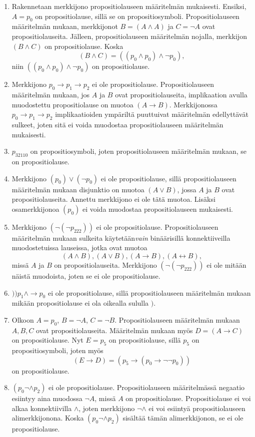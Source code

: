 \documentclass[11pt,a4paper]{amsart}
\begin{document}
\begin{solution}
\leavevmode\par
\begin{enumerate}[label=\alph*), nosep]
\item Rakennetaan merkkijono propositiolauseen määritelmän mukaisesti. Ensiksi,
\(A = p_0\) on propositiolause, sillä se on propositiosymboli.
Propositiolauseen määritelmän mukaan, merkkijonot
\(B = (A \land A)\) ja \(C = \neg A\) ovat propositiolauseita. Jälleen,
propositiolauseen määritelmän nojalla, merkkijon \((B \land C)\) on
propositiolause. Koska
\[(B \land C) = ((p_0 \land p_0) \land \neg p_0),\]
niin \(((p_0 \land p_0) \land \neg p_0)\) on propositiolause.
\item Merkkijono \(p_0 \rightarrow p_1 \rightarrow p_2\) ei ole propositiolause.
Propositiolauseen määritelmän mukaan, jos \(A\) ja \(B\) ovat
propositiolauseita, implikaation avulla muodostettu propositiolause on muotoa
\((A \rightarrow B)\). Merkkijonossa \(p_0 \rightarrow p_1 \rightarrow p_2\)
implikaatioiden ympäriltä puuttuivat määritelmän edellyttävät sulkeet, joten
sitä ei voida muodostaa propositiolauseen määritelmän mukaisesti.
\item \(p_{32110}\) on propositiosymboli, joten propositiolauseen määritelmän
mukaan, se on propositiolause.
\item Merkkijono \((p_0) \lor (\neg p_0)\) ei ole propositiolause, sillä
propositiolauseen määritelmän mukaan disjunktio on muotoa \((A \lor B)\),
jossa \(A\) ja \(B\) ovat propositiolauseita. Annettu merkkijono ei ole
tätä muotoa. Lisäksi osamerkkijonoa \((p_0)\) ei voida muodostaa
propositiolauseen mukaisesti.
\item Merkkijono \((\neg(\neg p_{222}))\) ei ole propositiolause.
Propositiolauseen määritelmän mukaan sulkeita käytetään\emph{vain}
binäärisillä konnektiiveilla muodostetuissa lauseissa, jotka ovat muotoa
\[(A \land B), (A \lor B), (A \rightarrow B), (A \leftrightarrow B),\]
missä \(A\) ja \(B\) on propositiolauseita. Merkkijono \((\neg(\neg p_{222}))\)
ei ole mitään näistä muodoista, joten se ei ole propositiolause.
\item \())p_1\land \rightarrow p_0\) ei ole propositiolause, sillä
propositiolauseen määritelmän mukaan mikään propositiolause ei ola
oikealla sululla \()\).
\item Olkoon \(A = p_0\), \(B = \neg A\), \(C = \neg B\). Propositiolauseen
määritelmän mukaan \(A,B,C\) ovat propositiolauseita. Määritelmän mukaan myös
\(D = (A \rightarrow C)\) on propositiolause. Nyt \(E = p_5\) on
propositiolause, sillä \(p_5\) on propositiosymboli, joten myös
\[(E \rightarrow D) = (p_5 \rightarrow (p_0 \rightarrow \neg \neg p_0))\]
on propositiolause.
\item \((p_0 \neg \land p_2)\) ei ole propositiolause. Propositiolauseen
määritelmässä negaatio esiintyy aina muodossa \(\neg A\), missä \(A\)
on propositiolause. Propositiolause ei voi alkaa konnektiivilla \(\land\),
joten merkkijono \(\neg \land\) ei voi esiintyä propositiolauseen
alimerkkijonona. Koska \((p_0 \neg \land p_2)\) sisältää tämän
alimerkkijonon, se ei ole propositiolause.
\end{enumerate}
\end{solution}
\end{document}
